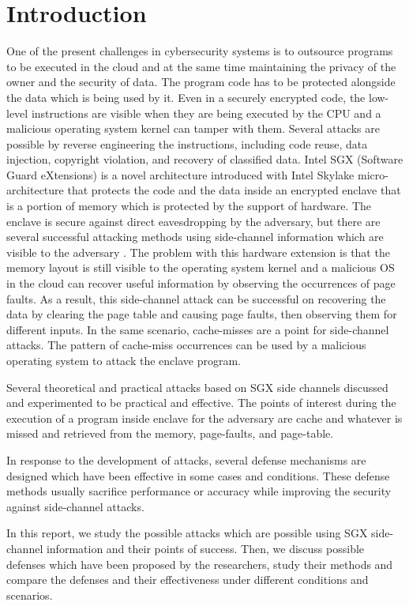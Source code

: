 \section{Introduction}

One of the present challenges in cybersecurity systems is to outsource programs to be executed in the cloud and at the same time maintaining the privacy of the owner and the security of data. The program code has to be protected alongside the data which is being used by it. Even in a securely encrypted code, the low-level instructions are visible when they are being executed by the CPU and a malicious operating system kernel can tamper with them. Several attacks are possible by reverse engineering the instructions, including code reuse, data injection, copyright violation, and recovery of classified data. Intel SGX (Software Guard eXtensions) \cite{sgx} is a novel architecture introduced with Intel Skylake micro-architecture \cite{skylake} that protects the code and the data inside an encrypted enclave that is a portion of memory which is protected by the support of hardware. The enclave is secure against direct eavesdropping by the adversary, but there are several successful attacking methods using side-channel information which are visible to the adversary \cite{leakycauldron}. The problem with this hardware extension is that the memory layout is still visible to the operating system kernel and a malicious OS in the cloud can recover useful information by observing the occurrences of page faults. As a result, this side-channel attack can be successful on recovering the data by clearing the page table and causing page faults, then observing them for different inputs. In the same scenario, cache-misses are a point for side-channel attacks. The pattern of cache-miss occurrences can be used by a malicious operating system to attack the enclave program.

Several theoretical and practical attacks based on SGX side channels discussed and experimented to be practical and effective. The points of interest during the execution of a program inside enclave for the adversary are cache and whatever is missed and retrieved from the memory, page-faults, and page-table.

In response to the development of attacks, several defense mechanisms are designed which have been effective in some cases and conditions. These defense methods usually sacrifice performance or accuracy while improving the security against side-channel attacks. 

In this report, we study the possible attacks which are possible using SGX side-channel information and their points of success. Then, we discuss possible defenses which have been proposed by the researchers, study their methods and compare the defenses and their effectiveness under different conditions and scenarios.

